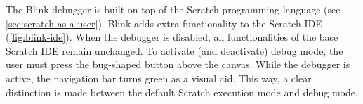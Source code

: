\documentclass[../main]{subfiles}
\begin{document}
%


The Blink debugger is built on top of the Scratch programming language (see \vref{sec:scratch-as-a-user}).
Blink adds extra functionality to the Scratch IDE (\vref{fig:blink-ide}).
When the debugger is disabled, all functionalities of the base Scratch IDE remain unchanged.
To activate (and deactivate) debug mode, the user must press the bug-shaped button above the canvas.
While the debugger is active, the navigation bar turns green as a visual aid.
This way, a clear distinction is made between the default Scratch execution mode and debug mode.
\end{document}

